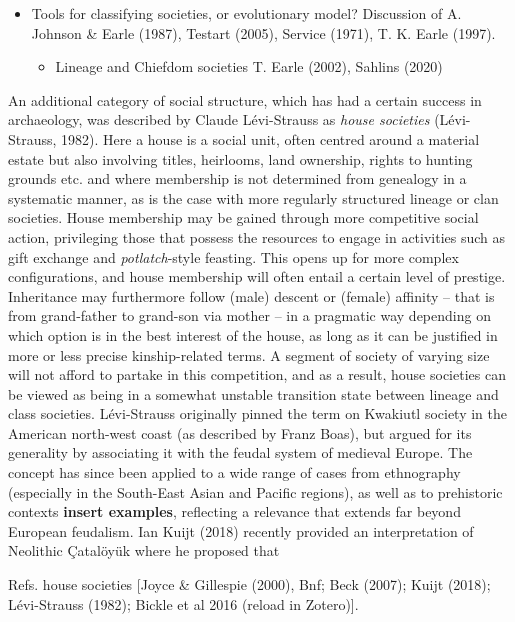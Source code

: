 \documentclass[
  12pt,
]{book}
\providecommand{\tightlist}{%
  \setlength{\itemsep}{0pt}\setlength{\parskip}{0pt}}
\begin{document}
\begin{itemize}
\item
  Tools for classifying societies, or evolutionary model? Discussion of A. Johnson \& Earle (1987), Testart (2005), Service (1971), T. K. Earle (1997).

  \begin{itemize}
  \tightlist
  \item
    Lineage and Chiefdom societies T. Earle (2002), Sahlins (2020)
  \end{itemize}
\end{itemize}

An additional category of social structure, which has had a certain success in archaeology, was described by Claude Lévi-Strauss as \emph{house societies} (Lévi-Strauss, 1982). Here a house is a social unit, often centred around a material estate but also involving titles, heirlooms, land ownership, rights to hunting grounds etc. and where membership is not determined from genealogy in a systematic manner, as is the case with more regularly structured lineage or clan societies. House membership may be gained through more competitive social action, privileging those that possess the resources to engage in activities such as gift exchange and \emph{potlatch}-style feasting. This opens up for more complex configurations, and house membership will often entail a certain level of prestige. Inheritance may furthermore follow (male) descent or (female) affinity -- that is from grand-father to grand-son via mother -- in a pragmatic way depending on which option is in the best interest of the house, as long as it can be justified in more or less precise kinship-related terms. A segment of society of varying size will not afford to partake in this competition, and as a result, house societies can be viewed as being in a somewhat unstable transition state between lineage and class societies. Lévi-Strauss originally pinned the term on Kwakiutl society in the American north-west coast (as described by Franz Boas), but argued for its generality by associating it with the feudal system of medieval Europe. The concept has since been applied to a wide range of cases from ethnography (especially in the South-East Asian and Pacific regions), as well as to prehistoric contexts \textbf{insert examples}, reflecting a relevance that extends far beyond European feudalism. Ian Kuijt (2018) recently provided an interpretation of Neolithic Çatalöyük where he proposed that

Refs. house societies {[}Joyce \& Gillespie (2000), Bnf; Beck (2007); Kuijt (2018); Lévi-Strauss (1982); Bickle et al 2016 (reload in Zotero){]}.
\end{document}

